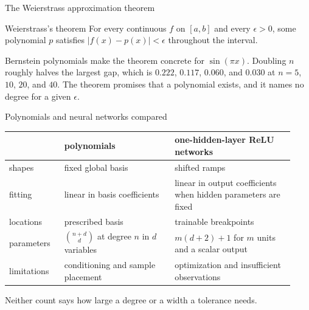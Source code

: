 \documentclass[aspectratio=169]{beamer}
\begin{document}
\begin{frame}{The Weierstrass approximation theorem}
\begin{block}{Weierstrass's theorem}
For every continuous $f$ on $[a,b]$ and every $\epsilon>0$, some polynomial $p$ satisfies
$|f(x)-p(x)|<\epsilon$ throughout the interval.
\end{block}
\begin{center}
\end{center}
Bernstein polynomials make the theorem concrete for $\sin(\pi x)$.
Doubling $n$ roughly halves the largest gap, which is $0.222$, $0.117$, $0.060$, and $0.030$ at $n=5$, $10$, $20$, and $40$.
The theorem promises that a polynomial exists, and it names no degree for a given $\epsilon$.
\end{frame}

\begin{frame}{Polynomials and neural networks compared}
\footnotesize
\begin{tabular}{@{}p{0.18\linewidth}p{0.36\linewidth}p{0.39\linewidth}@{}}
\toprule
& polynomials & one-hidden-layer ReLU networks\\
\midrule
shapes & fixed global basis & shifted ramps\\
fitting & linear in basis coefficients & linear in output coefficients when hidden parameters are fixed\\
locations & prescribed basis & trainable breakpoints\\
parameters & $\binom{n+d}{d}$ at degree $n$ in $d$ variables & $m(d+2)+1$ for $m$ units and a scalar output\\
limitations & conditioning and sample placement & optimization and insufficient observations\\
\bottomrule
\end{tabular}
\medskip

\normalsize
Neither count says how large a degree or a width a tolerance needs.
\end{frame}
\end{document}
